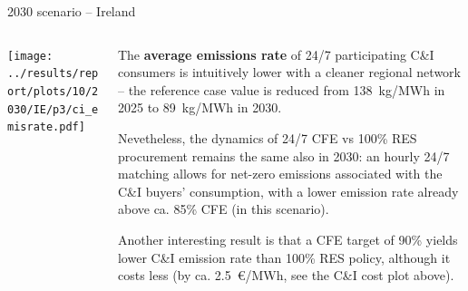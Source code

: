 \begin{frame}{2030 scenario -- Ireland}

{\footnotesize
\vspace{0.3cm}

\begin{columns}[T]
\begin{column}{9cm}
\centering

\texttt{[image: ../results/report/plots/10/2030/IE/p3/ci\_emisrate.pdf]}

\end{column}
\begin{column}{6cm}

\vspace{0.1cm}
The {\bf average emissions rate} of 24/7 participating C\&I consumers
is intuitively lower with a cleaner regional network -- 
the reference case value is reduced from 138~kg/MWh in 2025 to 
89~kg/MWh in 2030.

\vspace{0.3cm}
Nevetheless, the dynamics of 24/7 CFE vs 100\% RES 
procurement remains the same also in 2030: an hourly 24/7 matching 
allows for net-zero emissions associated with the C\&I buyers' consumption,
with a lower emission rate already above ca. 85\% CFE (in this scenario).

\vspace{0.3cm}
Another interesting result is that a CFE target of 90\% yields 
\alert{lower C\&I emission rate} than 100\% RES policy, although it 
\alert{costs less} (by ca. 2.5~\euro/MWh, see the C\&I cost plot above).

\end{column}
\end{columns}
}
\end{frame}


